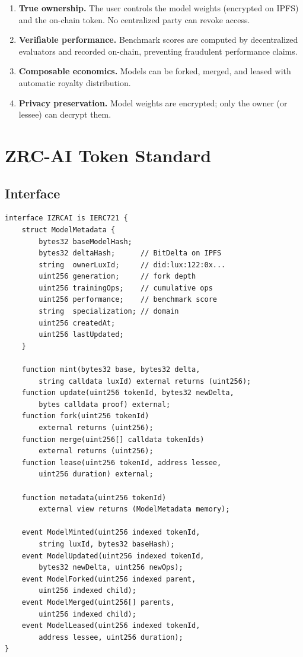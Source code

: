 \documentclass[11pt,letterpaper]{article}
\begin{document}
\begin{enumerate}
    \item \textbf{True ownership.} The user controls the model weights (encrypted on IPFS) and the on-chain token. No centralized party can revoke access.
    \item \textbf{Verifiable performance.} Benchmark scores are computed by decentralized evaluators and recorded on-chain, preventing fraudulent performance claims.
    \item \textbf{Composable economics.} Models can be forked, merged, and leased with automatic royalty distribution.
    \item \textbf{Privacy preservation.} Model weights are encrypted; only the owner (or lessee) can decrypt them.
\end{enumerate}

\section{ZRC-AI Token Standard}

\subsection{Interface}

\begin{lstlisting}[language=Solidity,caption=ZRC-AI interface (extends ERC-721)]
interface IZRCAI is IERC721 {
    struct ModelMetadata {
        bytes32 baseModelHash;
        bytes32 deltaHash;      // BitDelta on IPFS
        string  ownerLuxId;     // did:lux:122:0x...
        uint256 generation;     // fork depth
        uint256 trainingOps;    // cumulative ops
        uint256 performance;    // benchmark score
        string  specialization; // domain
        uint256 createdAt;
        uint256 lastUpdated;
    }

    function mint(bytes32 base, bytes32 delta,
        string calldata luxId) external returns (uint256);
    function update(uint256 tokenId, bytes32 newDelta,
        bytes calldata proof) external;
    function fork(uint256 tokenId)
        external returns (uint256);
    function merge(uint256[] calldata tokenIds)
        external returns (uint256);
    function lease(uint256 tokenId, address lessee,
        uint256 duration) external;

    function metadata(uint256 tokenId)
        external view returns (ModelMetadata memory);

    event ModelMinted(uint256 indexed tokenId,
        string luxId, bytes32 baseHash);
    event ModelUpdated(uint256 indexed tokenId,
        bytes32 newDelta, uint256 newOps);
    event ModelForked(uint256 indexed parent,
        uint256 indexed child);
    event ModelMerged(uint256[] parents,
        uint256 indexed child);
    event ModelLeased(uint256 indexed tokenId,
        address lessee, uint256 duration);
}
\end{lstlisting}
\end{document}
